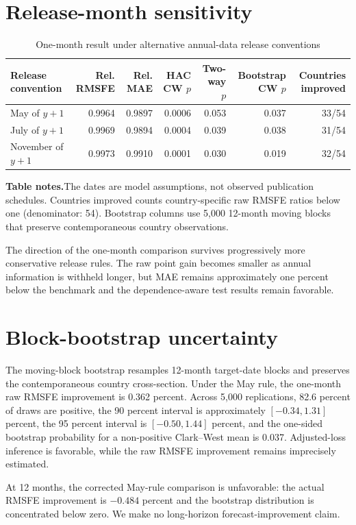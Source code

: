 \documentclass[12pt]{article}
\newcommand{\TableNote}[1]{%
  \par\vspace{0.65ex}\noindent
  \begin{minipage}{0.97\linewidth}\footnotesize\singlespacing\raggedright
  \textbf{Table notes.}\enspace #1
  \end{minipage}}
\begin{document}
\section{Release-month sensitivity}
\begin{table}[htbp]
\centering\scriptsize
\caption{One-month result under alternative annual-data release conventions}
\begin{tabular}{lrrrrrr}
\toprule
Release convention & Rel. RMSFE & Rel. MAE & HAC CW $p$ & Two-way $p$ & Bootstrap CW $p$ & Countries improved\\
\midrule
May of $y+1$ & 0.9964 & 0.9897 & 0.0006 & 0.053 & 0.037 & 33/54\\
July of $y+1$ & 0.9969 & 0.9894 & 0.0004 & 0.039 & 0.038 & 31/54\\
November of $y+1$ & 0.9973 & 0.9910 & 0.0001 & 0.030 & 0.019 & 32/54\\
\bottomrule
\end{tabular}
\TableNote{The dates are model assumptions, not observed publication schedules. Countries improved counts country-specific raw RMSFE ratios below one (denominator: 54). Bootstrap columns use 5,000 12-month moving blocks that preserve contemporaneous country observations.}
\end{table}

The direction of the one-month comparison survives progressively more conservative release rules. The raw point gain becomes smaller as annual information is withheld longer, but MAE remains approximately one percent below the benchmark and the dependence-aware test results remain favorable.


\section{Block-bootstrap uncertainty}
The moving-block bootstrap resamples 12-month target-date blocks and preserves the contemporaneous country cross-section. Under the May rule, the one-month raw RMSFE improvement is 0.362 percent. Across 5,000 replications, 82.6 percent of draws are positive, the 90 percent interval is approximately $[-0.34,1.31]$ percent, the 95 percent interval is $[-0.50,1.44]$ percent, and the one-sided bootstrap probability for a non-positive Clark--West mean is 0.037. Adjusted-loss inference is favorable, while the raw RMSFE improvement remains imprecisely estimated.

At 12 months, the corrected May-rule comparison is unfavorable: the actual RMSFE improvement is $-0.484$ percent and the bootstrap distribution is concentrated below zero. We make no long-horizon forecast-improvement claim.
\end{document}
